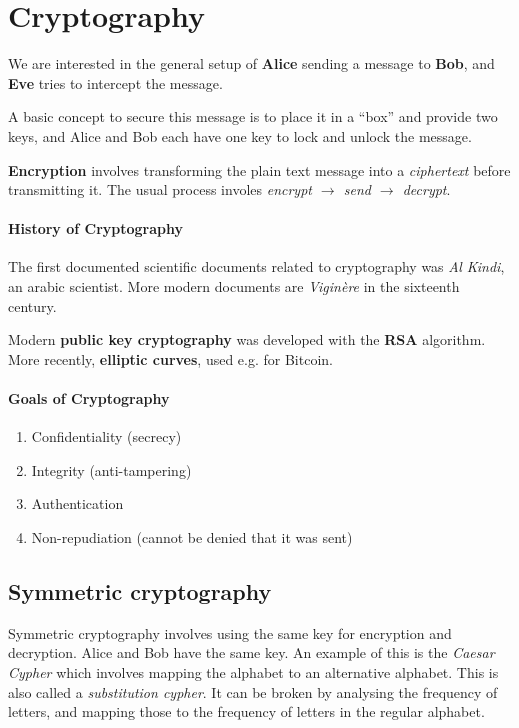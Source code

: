 \section{Cryptography}

We are interested in the general setup of \textbf{Alice} sending a message to \textbf{Bob}, and \textbf{Eve} tries to intercept the message.

A basic concept to secure this message is to place it in a ``box'' and provide two keys, and Alice and Bob each have one key to lock and unlock the message.

\textbf{Encryption} involves transforming the plain text message into a \textit{ciphertext} before transmitting it. The usual process involes \textit{encrypt $\rightarrow$ send $\rightarrow$ decrypt}.

\paragraph{History of Cryptography} The first documented scientific documents related to cryptography was \textit{Al Kindi}, an arabic scientist. More modern documents are \textit{Viginère} in the sixteenth century.

Modern \textbf{public key cryptography} was developed with the \textbf{RSA} algorithm. More recently, \textbf{elliptic curves}, used e.g. for Bitcoin.

\paragraph{Goals of Cryptography}

\begin{enumerate}
    \item Confidentiality (secrecy)
    \item Integrity (anti-tampering)
    \item Authentication
    \item Non-repudiation (cannot be denied that it was sent)
\end{enumerate}

\subsection{Symmetric cryptography}

Symmetric cryptography involves using the same key for encryption and decryption. Alice and Bob have the same key. An example of this is the \textit{Caesar Cypher} which involves mapping the alphabet to an alternative alphabet. This is also called a \textit{substitution cypher}. It can be broken by analysing the frequency of letters, and mapping those to the frequency of letters in the regular alphabet.


